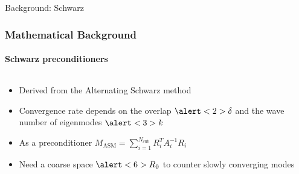 \footerinfootnotestrue
\begin{frame}[label=background,fragile]{Background: Schwarz}
    \frametitle{Mathematical Background}
    \framesubtitle{Schwarz preconditioners}
    \begin{columns}[T,onlytextwidth]
        \begin{column}{.5\textwidth}
            \begin{itemize}
                \item<1-> Derived from the Alternating Schwarz method\cite{schwarz_methods_Dolean_2015}
                \item<2-> Convergence rate depends on the overlap $\alert<2>{\delta}$ and the wave number of eigenmodes $\alert<3>{k}$
                \item<4-> As a preconditioner $M_{\text{ASM}} = \sum_{i=1}^{N_{\text{sub}}} R_i^T A_i^{-1} R_i$
                \item<5-> Need a coarse space $\alert<6>{R_0}$ to counter slowly converging modes
            \end{itemize}
        \end{column}
        \begin{column}{.49\textwidth}
\end{column}
\end{columns}
\end{frame}
